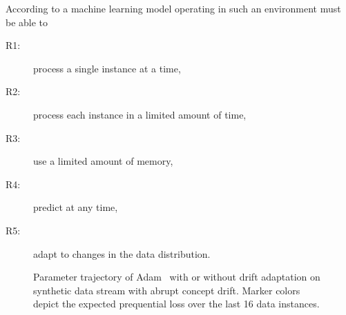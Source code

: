 \documentclass[letterpaper]{article} %
\begin{document}
According to \citet{bifetMOAMassiveOnline2010} a machine learning model operating in such an environment must be able to
\begin{center}
	\begin{varwidth}{0.5\textwidth}
		\begin{description}
			\item[R1:] process a single instance at a time,\label{rq:single_instance}
			\item[R2:] process each instance in a limited amount of time,\label{rq:limited_time}
			\item[R3:] use a limited amount of memory,\label{rq:limited_memory}
			\item[R4:] predict at any time,\label{rq:predict_any_time}
			\item[R5:] adapt to changes in the data distribution.\label{rq:adapt_to_drift}
		\end{description}
	\end{varwidth}
\end{center}

\begin{figure}[ht]
	\centering
	\caption{Parameter trajectory of Adam~\cite{kingmaAdamMethodStochastic2017b} with or without drift adaptation on synthetic data stream with abrupt concept drift. Marker colors depict the expected prequential loss over the last 16 data instances.}
\end{figure}
\end{document}
